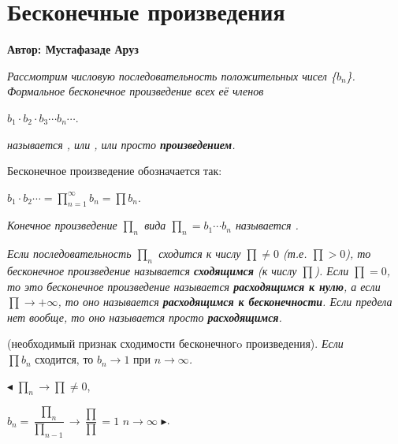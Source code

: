 \setcounter{object}{0}
\setcounter{approval}{0}
\setcounter{theorem}{0}
\setcounter{example}{0}

\chapter{Бесконечные произведения}
\centerline{ \bf Автор: Мустафазаде Аруз} \vskip 1cm
\begin{object}
\slshape{Рассмотрим числовую последовательность положительных чисел \{$b_n$\}. Формальное бесконечное произведение всех её членов}
\begin{center}
$b_{1}\cdot b_{2} \cdot b_{3} \cdots b_{n}  \cdots $.
\end{center}
\slshape{называется}\/
\upshape\mdseries{}, \slshape{или} 
\upshape\mdseries{},
\slshape{или просто} 
\upshape\mdseries\rmfamily\normalsize{\bfseries{произведением}}.

Бесконечное произведение обозначается так:
\begin{center}
$b_{1} \cdot b_{2} \cdots = \prod\limits_{n=1}^{\infty}b_{n} = \prod\limits b_{n}$.
\end{center}
\end{object}

\begin{object}
\slshape{Конечное произведение} $\prod\nolimits_{n}$ \slshape{вида} $\prod\nolimits_{n} = b_{1} \cdots b_{n}$
\slshape{называется} \upshape\mdseries{}.
\end{object}

\begin{object}
\slshape{Если последовательность} $\prod\nolimits_{n}$ \slshape{сходится к числу} $\prod \ne{0}$
(\slshape{т.е.} $\prod>0$), \slshape{то бесконечное произведение называется \upshape\mdseries\rmfamily\textbf{сходящимся} (к числу $\prod$)}.
\slshape{Если $\prod = 0$, то это бесконечное произведение называется \upshape\mdseries\rmfamily\textbf{расходящимся к нулю}, а если 
$\prod\to{+\infty}$, то оно называется \textbf{расходящимся к бесконечности}. Если предела нет вообще, то оно называется просто \upshape\mdseries\rmfamily\textbf{расходящимся}}.
\end{object}


\begin{approval}
(необходимый признак сходимости бесконечногo произведения).
\slshape{Если $\prod b_{n}\mbox{ сходится, то }b_{n}\to 1\mbox{ при }n\to \infty$}.
\end{approval}
$\blacktriangleleft$ \upshape\mdseries{} $\prod\nolimits_{n}\to \prod \ne{0}$, 
\upshape\mdseries{}
\begin{center}
$b_{n} = \dfrac{\prod\nolimits_{n}}{\prod\nolimits_{n-1}}\to \dfrac{\prod}{\prod} = 1$ \upshape\mdseries{} $n\to \infty$ $\blacktriangleright$.
\end{center}
\upshape\mdseries\rmfamily



